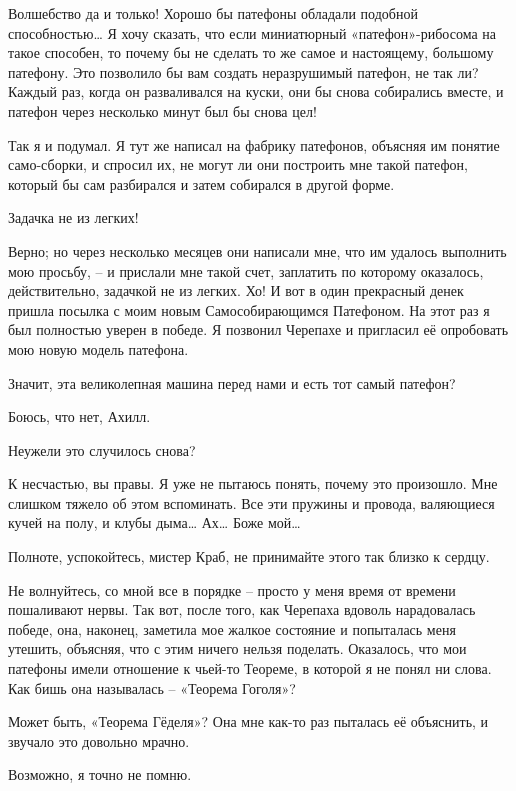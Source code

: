 \documentclass[../main.tex]{subfiles}
\begin{document}
\begin{dialogue}
 Волшебство да и только! Хорошо бы патефоны обладали подобной способностью\ldots{} Я хочу сказать, что если миниатюрный «патефон»-рибосома на такое способен, то почему бы не сделать то же самое и настоящему, большому патефону. Это позволило бы вам создать неразрушимый патефон, не так ли? Каждый раз, когда он разваливался на куски, они бы снова собирались вместе, и патефон через несколько минут был бы снова цел!

 Так я и подумал. Я тут же написал на фабрику патефонов, объясняя им понятие само-сборки, и спросил их, не могут ли они построить мне такой патефон, который бы сам разбирался и затем собирался в другой форме.

 Задачка не из легких!

 Верно; но через несколько месяцев они написали мне, что им удалось выполнить мою просьбу, \--- и прислали мне такой счет, заплатить по которому оказалось, действительно, задачкой не из легких. Хо! И вот в один прекрасный денек пришла посылка с моим новым Самособирающимся Патефоном. На этот раз я был полностью уверен в победе. Я позвонил Черепахе и пригласил её опробовать мою новую модель патефона.

 Значит, эта великолепная машина перед нами и есть тот самый патефон?

 Боюсь, что нет, Ахилл.

 Неужели это случилось снова?

 К несчастью, вы правы. Я уже не пытаюсь понять, почему это произошло. Мне слишком тяжело об этом вспоминать. Все эти пружины и провода, валяющиеся кучей на полу, и клубы дыма\ldots{} Ах\ldots{} Боже мой\ldots{}

 Полноте, успокойтесь, мистер Краб, не принимайте этого так близко к сердцу.

 Не волнуйтесь, со мной все в порядке \--- просто у меня время от времени пошаливают нервы. Так вот, после того, как Черепаха вдоволь нарадовалась победе, она, наконец, заметила мое жалкое состояние и попыталась меня утешить, объясняя, что с этим ничего нельзя поделать. Оказалось, что мои патефоны имели отношение к чьей-то Теореме, в которой я не понял ни слова. Как бишь она называлась \--- «Теорема Гоголя»?

 Может быть, «Теорема Гёделя»? Она мне как-то раз пыталась её объяснить, и звучало это довольно мрачно.

 Возможно, я точно не помню.


\end{dialogue}
\end{document}
